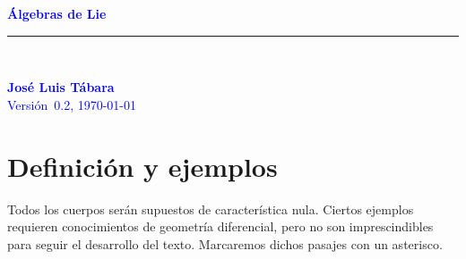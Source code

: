 \documentclass[a4paper,draft,12pt]{scrartcl}
\author{José Luis Tábara Carbajo}
\begin{document}
\newlength{\centeroffset}
\setlength{\centeroffset}{-0.5\oddsidemargin}
\addtolength{\centeroffset}{0.4\evensidemargin}
\addtolength{\textwidth}{-\centeroffset}
\thispagestyle{empty}
\noindent\hspace*{\centeroffset}\begin{minipage}{\textwidth}
\flushright
\textcolor{blue}{
{\Huge \bfseries \sf  Álgebras de Lie}
\noindent\rule[-1ex]{\textwidth}{5pt}\\[4.5ex]}
\end{minipage}


\noindent\hspace*{\centeroffset}\begin{minipage}{\textwidth}
\flushright
\textcolor{blue}{
 {\bfseries  
José Luis Tábara\\[1.5ex]} 
Versión~0.2, \today\\} %

\end{minipage}



\newpage


\tableofcontents

\newpage











\section{Definición y ejemplos}




\rhead{\footnotesize \bf  \thepage}
\cfoot{}
\pagestyle{fancy}
\setcounter{page}{1}





 Todos los cuerpos   serán supuestos de característica nula.
Ciertos ejemplos requieren conocimientos de geometría diferencial, pero no son imprescindibles para seguir el desarrollo del texto.  Marcaremos dichos pasajes con un asterisco.
\end{document}
